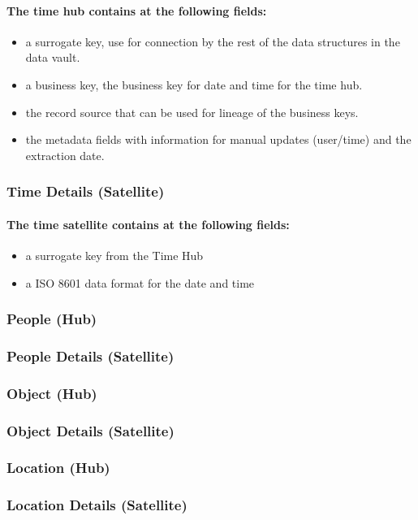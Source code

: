 \documentclass{acm_proc_article-sp}
\begin{document}
\paragraph{The time hub contains at the following fields:}
\begin{itemize}
\item{a surrogate key, use for connection by the rest of the data structures in the data vault.}
\item{a business key, the business key for date and time for the time hub.}
\item{the record source that can be used for lineage of the business keys.}
\item{the metadata fields with information for manual updates (user/time) and the extraction date.}
\end{itemize}
\subsubsection{Time Details (Satellite)}
\paragraph{The time satellite contains at the following fields:}
\begin{itemize}
\item{a surrogate key from the Time Hub}
\item{a ISO 8601 data format for the date and time}
\end{itemize}
\subsubsection{People (Hub)}
\subsubsection{People Details (Satellite)}
\subsubsection{Object (Hub)}
\subsubsection{Object Details (Satellite)}
\subsubsection{Location (Hub)}
\subsubsection{Location Details (Satellite)}
\end{document}
